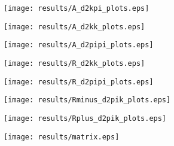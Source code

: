\documentclass[11pt,a4paper]{article}
\begin{document}
\texttt{[image: results/A\_d2kpi\_plots.eps]}

\texttt{[image: results/A\_d2kk\_plots.eps]}

\texttt{[image: results/A\_d2pipi\_plots.eps]}


\texttt{[image: results/R\_d2kk\_plots.eps]}

\texttt{[image: results/R\_d2pipi\_plots.eps]}


\texttt{[image: results/Rminus\_d2pik\_plots.eps]}

\texttt{[image: results/Rplus\_d2pik\_plots.eps]}


\clearpage
\texttt{[image: results/matrix.eps]}
\end{document}

